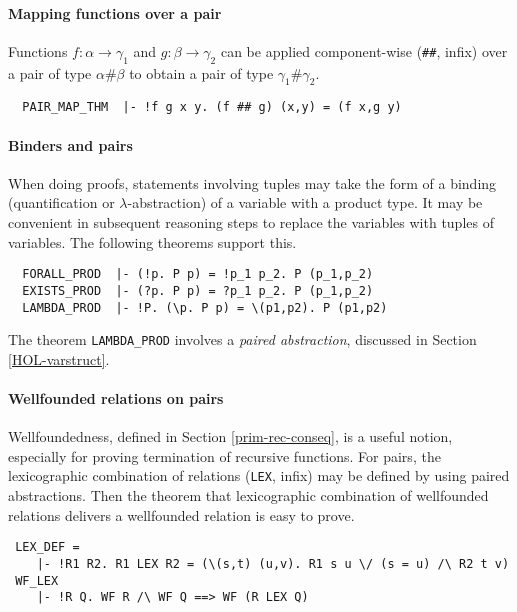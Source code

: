 \paragraph {Mapping functions over a pair}

Functions $f : \alpha \to \gamma_1$ and $g : \beta\to\gamma_2$ can be
applied component-wise ({\small\verb+##+}, infix) over a pair of type
$\alpha \# \beta$ to obtain a pair of type $\gamma_1 \# \gamma_2$.
%
\begin{hol}
{\small
\begin{verbatim}
  PAIR_MAP_THM  |- !f g x y. (f ## g) (x,y) = (f x,g y)
\end{verbatim}}
\end{hol}

\paragraph {Binders and pairs}

When doing proofs, statements involving tuples may take the form of a
binding (quantification or $\lambda$-abstraction) of a variable with a
product type. It may be convenient in subsequent reasoning steps to
replace the variables with tuples of variables. The following theorems
support this.
%
 \begin{hol}
{\small
\begin{verbatim}
  FORALL_PROD  |- (!p. P p) = !p_1 p_2. P (p_1,p_2)
  EXISTS_PROD  |- (?p. P p) = ?p_1 p_2. P (p_1,p_2)
  LAMBDA_PROD  |- !P. (\p. P p) = \(p1,p2). P (p1,p2)
\end{verbatim}}
\end{hol}
%
The theorem {\small\verb+LAMBDA_PROD+} involves a \emph{paired
 abstraction}, discussed in Section \ref{HOL-varstruct}.


\paragraph {Wellfounded relations on pairs}

Wellfoundedness, defined in Section \ref{prim-rec-conseq},
is a useful notion, especially for proving termination of
recursive functions. For pairs, the lexicographic combination
of relations ({\small\verb+LEX+}, infix) may be defined by using
paired abstractions. Then the theorem that lexicographic combination
of wellfounded relations delivers a wellfounded relation is easy to
prove.
%
\begin{hol}
{\small
\begin{verbatim}
 LEX_DEF =
    |- !R1 R2. R1 LEX R2 = (\(s,t) (u,v). R1 s u \/ (s = u) /\ R2 t v)
 WF_LEX
    |- !R Q. WF R /\ WF Q ==> WF (R LEX Q)
\end{verbatim}}
\end{hol}


